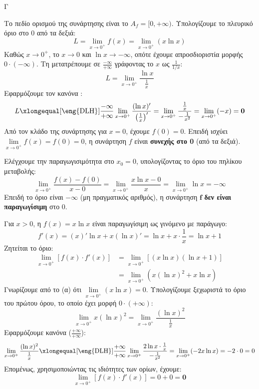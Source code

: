 \begin{thema}{Γ}
\begin{erwthma}
\item Το πεδίο ορισμού της συνάρτησης είναι το $A_f = [0, +\infty)$.
Υπολογίζουμε το πλευρικό όριο στο 0 από τα δεξιά:
\[ L = \lim_{x \to 0^+} f(x) = \lim_{x \to 0^+} (x \ln x) \]
Καθώς $x \to 0^+$, το $x \to 0$ και $\ln x \to -\infty$, οπότε έχουμε απροσδιοριστία μορφής $0 \cdot (-\infty)$. 
Τη μετατρέπουμε σε $\frac{-\infty}{+\infty}$ γράφοντας το $x$ ως $\frac{1}{1/x}$:
\[ L = \lim_{x \to 0^+} \frac{\ln x}{\frac{1}{x}} \]
Εφαρμόζουμε τον κανόνα :
\[ L \xlongequal[\text{\eng{DLH}}]{\frac{-\infty}{+\infty}} \lim_{x \to 0^+} \frac{(\ln x)'}{\left(\frac{1}{x}\right)'} = \lim_{x \to 0^+} \frac{\frac{1}{x}}{-\frac{1}{x^2}} = \lim_{x \to 0^+} (-x) = \boldsymbol{0} \]
Από τον κλάδο της συνάρτησης για $x=0$, έχουμε $f(0) = 0$.
Επειδή ισχύει $\lim\limits_{x \to 0^+} f(x) = f(0) = 0$, η συνάρτηση $f$ είναι \textbf{συνεχής στο 0} (από τα δεξιά).

\item Ελέγχουμε την παραγωγισιμότητα στο $x_0=0$, υπολογίζοντας το όριο του πηλίκου μεταβολής:
\[ \lim_{x \to 0^+} \frac{f(x) - f(0)}{x - 0} = \lim_{x \to 0^+} \frac{x \ln x - 0}{x} = \lim_{x \to 0^+} \ln x = -\infty \]
Επειδή το όριο είναι $-\infty$ (μη πραγματικός αριθμός), η συνάρτηση $\boldsymbol{f}$ \textbf{δεν είναι παραγωγίσιμη} στο 0.

\item Για $x > 0$, η $f(x) = x \ln x$ είναι παραγωγίσιμη ως γινόμενο με παράγωγο:
\[ f'(x) = (x)' \ln x + x (\ln x)' = \ln x + x \cdot \frac{1}{x} = \ln x + 1 \]
Ζητείται το όριο:
\begin{align*}
\lim_{x \to 0^+} [ f(x) \cdot f'(x) ] &= \lim_{x \to 0^+} [ (x \ln x) (\ln x + 1) ] \\
&= \lim_{x \to 0^+} ( x (\ln x)^2 + x \ln x )
\end{align*}
Γνωρίζουμε από το (α) ότι $\lim\limits_{x \to 0^+} (x \ln x) = 0$. 
Υπολογίζουμε ξεχωριστά το όριο του πρώτου όρου, το οποίο έχει μορφή $0 \cdot (+\infty)$:
\[ \lim_{x \to 0^+} x(\ln x)^2 = \lim_{x \to 0^+} \frac{(\ln x)^2}{\frac{1}{x}} \]
Εφαρμόζουμε κανόνα  ($\frac{+\infty}{+\infty}$):
\[ \lim_{x \to 0^+} \frac{(\ln x)^2}{\frac{1}{x}} \xlongequal[\text{\eng{DLH}}]{\frac{+\infty}{+\infty}} \lim_{x \to 0^+} \frac{2 \ln x \cdot \frac{1}{x}}{-\frac{1}{x^2}} = \lim_{x \to 0^+} (-2x \ln x) = -2 \cdot 0 = 0 \]
Επομένως, χρησιμοποιώντας τις ιδιότητες των ορίων, έχουμε:
\[ \lim_{x \to 0^+} [ f(x) \cdot f'(x) ] = 0 + 0 = \boldsymbol{0} \]


\end{erwthma}
\end{thema}
